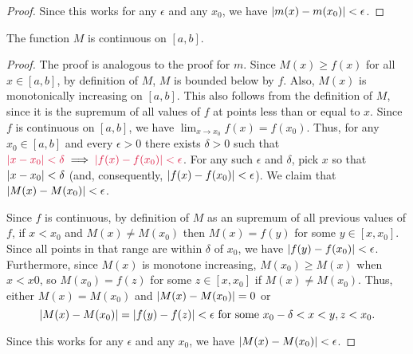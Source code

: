 \begin{answer}
\begin{claim}
\begin{proof}
        Since this works for any $\epsilon$ and any $x_0$,
        we have $\lvert m(x) - m(x_0)\rvert < \epsilon$.
    \end{proof}
  \end{claim}

  \newpage
  \begin{claim}
    The function $M$ is continuous on $[a, b]$.
    \begin{proof}
      The proof is analogous to the proof for $m$.
      Since $M(x) \geq f(x)$ for all $x \in [a, b]$, by definition of $M$,
      $M$ is bounded below by $f$.
      Also, $M(x)$ is monotonically increasing on $[a, b]$.
      This also follows from the definition of $M$, since it is the
      supremum of all values of $f$ at points less than or equal to $x$.
      Since $f$ is continuous on $[a, b]$, we have
      $\displaystyle \lim_{x \to x_0} f(x) = f(x_0)$.
      Thus, for any $x_0 \in [a, b]$ and every $\epsilon > 0$
      there exists $\delta > 0$ such that
      $\crim{\abs{x - x_0} < \delta} \implies \crim{\abs{f(x) - f(x_0)} < \epsilon}$.
      For any such $\epsilon$ and $\delta$, pick $x$ so that $\lvert x - x_0\rvert < \delta$
      (and, consequently, $\lvert f(x) - f(x_0)\rvert < \epsilon$).
      We claim that $\lvert M(x) - M(x_0)\rvert < \epsilon$.

      \step
        Since $f$ is continuous,
        by definition of $M$ as an supremum of all previous values of $f$,
        if $x < x_0$ and $M(x) \neq M(x_0)$
        then $M(x) = f(y)$ for some $y \in [x, x_0]$. Since all points in that range
        are within $\delta$ of $x_0$, we have $\lvert f(y) - f(x_0)\rvert < \epsilon$.
        Furthermore, since $M(x)$ is monotone increasing,
        $M(x_0) \geq M(x)$ when $x < x
        0$, so $M(x_0) = f(z)$ for some $z \in [x, x_0]$
        if $M(x) \neq M(x_0)$. Thus, either $M(x) = M(x_0)$ and $\lvert M(x) - M(x_0)\rvert = 0$
        or
        \[ 
          \lvert M(x) - M(x_0)\rvert = \lvert f(y) - f(z)\rvert < \epsilon \text{ for some } x_0 - \delta < x < y, z < x_0.
        \]

        Since this works for any $\epsilon$ and any $x_0$,
        we have $\lvert M(x) - M(x_0)\rvert < \epsilon$.
    \end{proof}

  \end{claim}
\end{answer}

